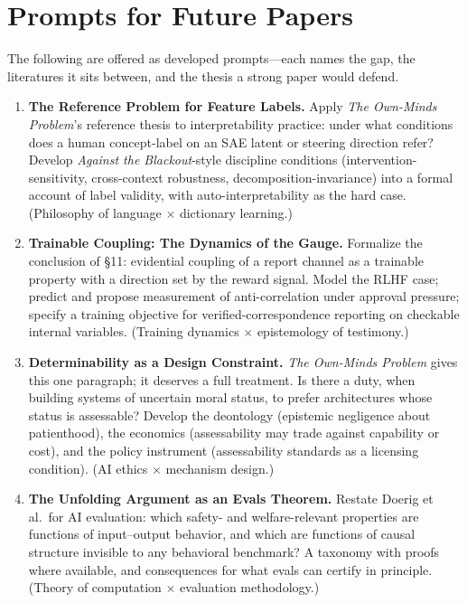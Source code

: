 \documentclass[11pt]{article}
\newcommand{\OM}{\emph{The Own-Minds Problem}}
\newcommand{\AB}{\emph{Against the Blackout}}
\begin{document}
\section{Prompts for Future Papers}

The following are offered as developed prompts---each names the gap, the literatures it sits between, and the thesis a strong paper would defend.

\begin{enumerate}[itemsep=0.45em]
\item \textbf{The Reference Problem for Feature Labels.} Apply \OM{}'s reference thesis to interpretability practice: under what conditions does a human concept-label on an SAE latent or steering direction refer? Develop \AB{}-style discipline conditions (intervention-sensitivity, cross-context robustness, decomposition-invariance) into a formal account of label validity, with auto-interpretability as the hard case. (Philosophy of language $\times$ dictionary learning.)

\item \textbf{Trainable Coupling: The Dynamics of the Gauge.} Formalize the conclusion of \S 11: evidential coupling of a report channel as a trainable property with a direction set by the reward signal. Model the RLHF case; predict and propose measurement of anti-correlation under approval pressure; specify a training objective for verified-correspondence reporting on checkable internal variables. (Training dynamics $\times$ epistemology of testimony.)

\item \textbf{Determinability as a Design Constraint.} \OM{} gives this one paragraph; it deserves a full treatment. Is there a duty, when building systems of uncertain moral status, to prefer architectures whose status is assessable? Develop the deontology (epistemic negligence about patienthood), the economics (assessability may trade against capability or cost), and the policy instrument (assessability standards as a licensing condition). (AI ethics $\times$ mechanism design.)

\item \textbf{The Unfolding Argument as an Evals Theorem.} Restate Doerig et al.\ for AI evaluation: which safety- and welfare-relevant properties are functions of input--output behavior, and which are functions of causal structure invisible to any behavioral benchmark? A taxonomy with proofs where available, and consequences for what evals can certify in principle. (Theory of computation $\times$ evaluation methodology.)


\end{enumerate}
\end{document}
